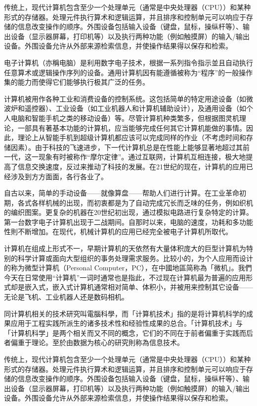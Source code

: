\documentclass[oneside,a4paper,12pt,AutoFakeBold]{book}%
\begin{document}
{传统上，现代计算机包含至少一个处理单元（通常是中央处理器（CPU））和某种形式的存储器。处理元件执行算术和逻辑运算，并且排序和控制单元可以响应于存储的信息改变操作的顺序。外围设备包括输入设备（键盘，鼠标，操纵杆等）、输出设备（显示器屏幕，打印机等）以及执行两种功能（例如触摸屏）的输入/输出设备。外围设备允许从外部来源检索信息，并使操作结果得以保存和检索。

电子计算机（亦稱电脑）是利用数字电子技术，根据一系列指令指示並且自动执行任意算术或逻辑操作序列的设备。通用计算机因有能遵循被称为“程序”的一般操作集的能力而使得它们能够执行极其广泛的任务。

计算机被用作各种工业和消费设备的控制系统。这包括简单的特定用途设备（如微波炉和遥控器）、工业设备（如工业机器人和计算机辅助设计），及通用设备（如个人电脑和智能手机之类的移动设备）等。尽管计算机种类繁多，但根据图灵机理论，一部具有著基本功能的计算机，应当能够完成任何其它计算机能做的事情。因此，理论上从智能手机到超级计算机都应该可以完成同样的作业（不考虑时间和存储因素）。由于科技的飞速进步，下一代计算机总是在性能上能够显著地超过其前一代，这一现象有时被称作“摩尔定律”。通过互联网，计算机互相连接，极大地提高了信息交换速度，反过来推动了科技的发展。在21世纪的现在，计算机的应用已经涉及到方方面面，各行各业了。

自古以来，简单的手动设备——就像算盘——帮助人们进行计算。在工业革命初期，各式各样机械的出现，而初衷都是为了自动完成冗长而乏味的任务，例如织机的编织图案。更复杂的机器在20世纪初出现，通过模拟电路进行复杂特定的计算。第一台数字电子计算机出现于二战期间。自那时以来，电脑的速度，功耗和多功能性則不断增加。在现代，机械计算机的应用已经完全被电子计算机所取代。

计算机在组成上形式不一，早期计算机的天依然有大量体积庞大的巨型计算机为特别的科学计算或面向大型组织的事务处理需求服务。比较小的，为个人应用而设计的称为微型计算机（Personal Computer，PC），在中國地區简称為「微机」。我們今天在日常使用“计算机”一词时通常也是指此，不过现在计算机最为普遍的应用形式却是嵌入式，嵌入式计算机通常相对简单、体积小，并被用来控制其它设备——无论是飞机、工业机器人还是数码相机。

同计算机相关的技术研究叫電腦科學，而「计算机技术」指的是将计算机科学的成果应用于工程实践所派生的诸多技术性和经验性成果的总合。「计算机技术」与「计算机科学」是两个相关而又不同的概念，它们的不同在于前者偏重于实践而后者偏重于理论。至於由数据为核心的研究則称為信息技术。

传统上，现代计算机包含至少一个处理单元（通常是中央处理器（CPU））和某种形式的存储器。处理元件执行算术和逻辑运算，并且排序和控制单元可以响应于存储的信息改变操作的顺序。外围设备包括输入设备（键盘，鼠标，操纵杆等）、输出设备（显示器屏幕，打印机等）以及执行两种功能（例如触摸屏）的输入/输出设备。外围设备允许从外部来源检索信息，并使操作结果得以保存和检索。
}
\end{document}
